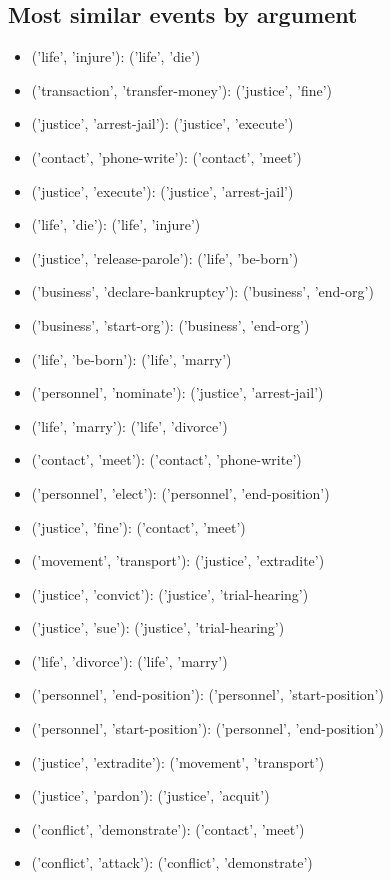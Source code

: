 \documentclass[11pt, oneside]{article}   	%
\begin{document}
\subsection{Most similar events by argument}
\begin{itemize}
\item[] ('life', 'injure'): ('life', 'die')
\item[] ('transaction', 'transfer-money'): ('justice', 'fine')
\item[] ('justice', 'arrest-jail'): ('justice', 'execute')
\item[] ('contact', 'phone-write'): ('contact', 'meet')
\item[] ('justice', 'execute'): ('justice', 'arrest-jail')
\item[] ('life', 'die'): ('life', 'injure')
\item[] ('justice', 'release-parole'): ('life', 'be-born')
\item[] ('business', 'declare-bankruptcy'): ('business', 'end-org')
\item[]  ('business', 'start-org'): ('business', 'end-org')
\item[] ('life', 'be-born'): ('life', 'marry')
\item[] ('personnel', 'nominate'): ('justice', 'arrest-jail')
\item[] ('life', 'marry'): ('life', 'divorce')
\item[] ('contact', 'meet'): ('contact', 'phone-write')
\item[] ('personnel', 'elect'): ('personnel', 'end-position')
\item[] ('justice', 'fine'): ('contact', 'meet')
\item[] ('movement', 'transport'): ('justice', 'extradite')
\item[] ('justice', 'convict'): ('justice', 'trial-hearing')
\item[] ('justice', 'sue'): ('justice', 'trial-hearing')
\item[] ('life', 'divorce'): ('life', 'marry')
\item[] ('personnel', 'end-position'): ('personnel', 'start-position')
\item[] ('personnel', 'start-position'): ('personnel', 'end-position')
\item[] ('justice', 'extradite'): ('movement', 'transport')
\item[] ('justice', 'pardon'): ('justice', 'acquit')
\item[] ('conflict', 'demonstrate'): ('contact', 'meet')
\item[] ('conflict', 'attack'): ('conflict', 'demonstrate')

\end{itemize}
\end{document}
